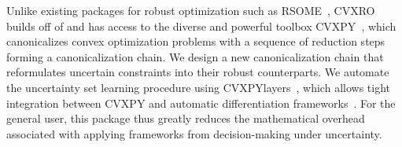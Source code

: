 Unlike existing packages for robust optimization such as RSOME~\cite{Rsome}, \gls{CVXRO} builds off of and has access to the diverse and powerful toolbox CVXPY~\cite{diamond2016cvxpy}, which canonicalizes convex optimization problems with a sequence of reduction steps forming a canonicalization chain. We design a new canonicalization chain that reformulates uncertain constraints into their robust counterparts. We automate the uncertainty set learning procedure using CVXPYlayers~\cite{cvxpylayers2019}, which allows tight integration between CVXPY and automatic differentiation frameworks~\cite{diffcp2019}.
For the general user, this package thus greatly reduces the mathematical overhead associated with applying frameworks from decision-making under uncertainty.




